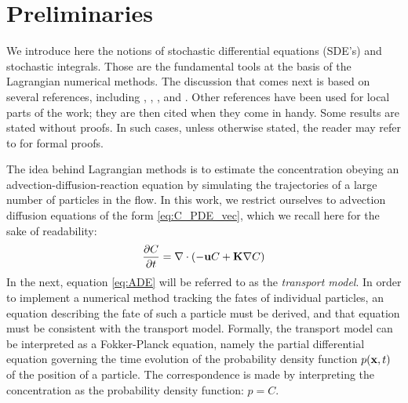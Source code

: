 \section{Preliminaries}
We introduce here the notions of stochastic differential equations (SDE's) and stochastic integrals. Those are the fundamental tools at the basis of the Lagrangian numerical methods. The discussion that comes next is based on several references, including \cite{gardiner1985stochastic}, \cite{heemink2011slides}, \cite{keunings}, \cite{spivakovskaya2007lagrangian} and \cite{shah2017tracing}. Other references have been used for local parts of the work; they are then cited when they come in handy. Some results are stated without proofs. In such cases, unless otherwise stated, the reader may refer to \cite{gardiner1985stochastic} for formal proofs.

The idea behind Lagrangian methods is to estimate the concentration obeying an advection-diffusion-reaction equation by simulating the trajectories of a large number of particles in the flow. In this work, we restrict ourselves to advection diffusion equations of the form \eqref{eq:C_PDE_vec}, which we recall here for the sake of readability:
\begin{equation} \label{eq:ADE}
	\frac{\partial C}{\partial t} = \nabla \cdot (-\mathbf u C + \mathbf K \nabla C)
\end{equation}
In the next, equation \eqref{eq:ADE} will be referred to as the \textit{transport model}. In order to implement a numerical method tracking the fates of individual particles, an equation describing the fate of such a particle must be derived, and that equation must be consistent with the transport model. Formally, the transport model can be interpreted as a Fokker-Planck equation, namely the partial differential equation governing the time evolution of the probability density function $p(\mathbf x,t)$ of the position of a particle. The correspondence is made by interpreting the concentration as the probability density function: $p=C$. 


